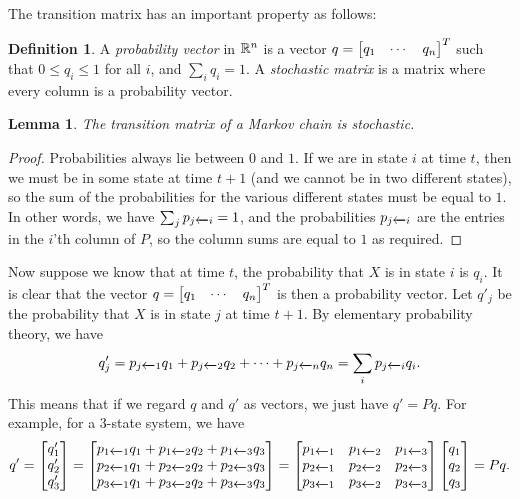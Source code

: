 \documentclass[reqno]{amsart}
\newtheorem{lemma}[theorem]{Lemma}
\theoremstyle{definition}
\newtheorem{definition}[theorem]{Definition}
\newcommand{\dfn}[1]{\emph{{#1}}\index{#1}}
\begin{document}
The transition matrix has an important property as follows:
\begin{definition}\label{defn-stochastic}
 A \dfn{probability vector} in ${\mathbb{R}}^n$ is a vector
 $q=\left[\begin{matrix} q_1 & \cdots & q_n\end{matrix}\right]^T$ such that $0\leq q_i\leq 1$ for all
 $i$, and $\sum_iq_i=1$.  A \emph{stochastic matrix} is a matrix where
 every column is a probability vector.
\end{definition}

\begin{lemma}\label{lem-markov-stochastic}
 The transition matrix of a Markov chain is stochastic.
\end{lemma}
\begin{proof}
 Probabilities always lie between $0$ and $1$.  If we are in state $i$
 at time $t$, then we must be in some state at time $t+1$ (and we
 cannot be in two different states), so the sum of the probabilities for
 the various different states must be equal to $1$.  In other words,
 we have $\sum_jp_{j\xleftarrow{}i}=1$, and the probabilities $p_{j\xleftarrow{}i}$
 are the entries in the $i$'th column of $P$, so the column sums are
 equal to $1$ as required.
\end{proof}

Now suppose we know that at time $t$, the probability that $X$ is in
state $i$ is $q_i$.  It is clear that the vector
$q=\left[\begin{matrix} q_1 & \cdots & q_n\end{matrix}\right]^T$ is then a probability vector.
Let $q'_j$ be the probability that $X$ is in state $j$ at time $t+1$.
By elementary probability theory, we have
\[ q'_j = p_{j\xleftarrow{}1} q_1 +
          p_{j\xleftarrow{}2} q_2 + \dotsb +
          p_{j\xleftarrow{}n} q_n
        = \sum_i p_{j\xleftarrow{}i} q_i.
\]
This means that if we regard $q$ and $q'$ as vectors, we just have
$q'=Pq$.  For example, for a $3$-state system, we have
\[ q'
   = \left[\begin{matrix} q'_1\\ q'_2 \\ q'_3 \end{matrix}\right]
   = \left[\begin{matrix}
      p_{1\xleftarrow{}1} q_1 +  p_{1\xleftarrow{}2} q_2 +  p_{1\xleftarrow{}3} q_3 \\
      p_{2\xleftarrow{}1} q_1 +  p_{2\xleftarrow{}2} q_2 +  p_{2\xleftarrow{}3} q_3 \\
      p_{3\xleftarrow{}1} q_1 +  p_{3\xleftarrow{}2} q_2 +  p_{3\xleftarrow{}3} q_3
     \end{matrix}\right]
   = \left[\begin{matrix}
      p_{1\xleftarrow{}1} & p_{1\xleftarrow{}2} & p_{1\xleftarrow{}3} \\
      p_{2\xleftarrow{}1} & p_{2\xleftarrow{}2} & p_{2\xleftarrow{}3} \\
      p_{3\xleftarrow{}1} & p_{3\xleftarrow{}2} & p_{3\xleftarrow{}3}
     \end{matrix}\right]
     \left[\begin{matrix} q_1 \\ q_2 \\ q_3 \end{matrix}\right]
   = Pq.
\]
\end{document}
